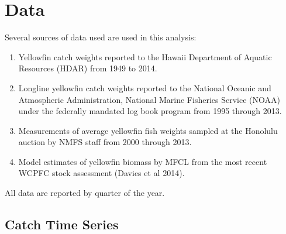 \documentclass[12pt,letterpaper]{article}
\begin{document}
\section*{Data}
Several sources of data used are used in this analysis:
\begin{enumerate}
\item  Yellowfin catch weights reported to the Hawaii Department of Aquatic
Resources (HDAR) from 1949 to 2014.
\item Longline yellowfin catch weights reported to the National Oceanic and
Atmospheric Administration, National Marine Fisheries Service (NOAA)
under the federally mandated log book program from 1995 through 2013.
\item Measurements of average yellowfin fish weights sampled at the
Honolulu auction by NMFS staff from 2000 through 2013.
\item Model estimates of yellowfin biomass by MFCL
from the most recent WCPFC stock assessment (Davies et al 2014).
\end{enumerate}
All data are reported by quarter of the year.

\subsection*{Catch Time Series}


\end{document}
